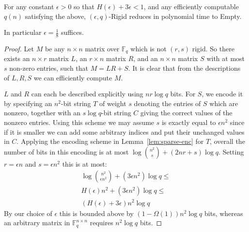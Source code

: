 \begin{theorem}\label{thm:rigid-in-apepp}
For any constant $\epsilon>0$ so that $H(\epsilon) + 3\epsilon < 1$, and any efficiently computable $q(n)$ satisfying the above, {\sc $(\epsilon, q)$-Rigid} reduces in polynomial time to {\sc Empty}.
\end{theorem}
In particular $\epsilon = \frac{1}{8}$ suffices.
\begin{proof}
Let $M$ be any $n \times n$ matrix over $\mathbb{F}_q$ which is not $(r,s)$ rigid. So there exists an $n \times r$ matrix $L$, an $r \times n$ matrix $R$, and an $n \times n$ matrix $S$ with at most $s$ non-zero entries, such that $M = LR + S$. It is clear that from the descriptions of $L,R,S$ we can efficiently compute $M$.

$L$ and $R$ can each be described explicitly using $nr \log q$ bits. For $S$, we encode it by specifying an $n^2$-bit string $T$ of weight $s$ denoting the entries of $S$ which are nonzero, together with an $s \log q$-bit string $C$ giving the correct values of the nonzero entries. Using this scheme we may assume $s$ is exactly equal to $\epsilon n^2$ since if it is smaller we can add some arbitrary indices and put their unchanged values in $C$. Applying the encoding scheme in Lemma~\ref{lem:sparse-enc} for $T$, overall the number of bits in this encoding is at most $\log\binom{n^2}{s} + (2nr + s)\log q$. Setting $r = \epsilon n$ and $s= \epsilon n^2$ this is at most:
\begin{gather*}
\log\binom{n^2}{\epsilon n^2} + (3\epsilon n^2)\log q
 \leq \\
H(\epsilon)n^2 + (3 \epsilon n^2)\log q \leq \\
(H(\epsilon) + 3\epsilon)n^2\log q
\end{gather*}
By our choice of $\epsilon$ this is bounded above by $(1- \Omega(1))n^2\log q$ bits, whereas an arbitrary matrix in  $\mathbb{F}_q^{n \times n}$ requires $n^2\log q$ bits.
\end{proof}


